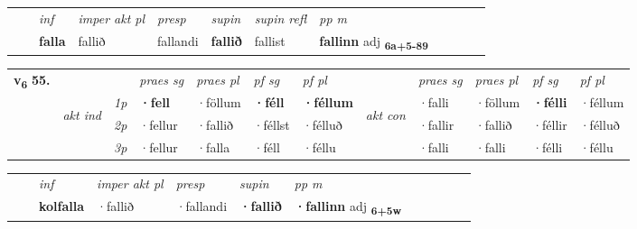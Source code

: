 \begin{tabular}{llllllllllll}
 & & \textit{inf}  & \textit{imper akt pl}   & \textit{presp} & \textit{supin} & \textit{supin refl} & \textit{pp m}     \\*
  & & \textbf{falla}   & fallið   & fallandi &  \textbf{fallið} & fallist & \textbf{fallinn} adj \textbf{\textsubscript{6a+5-89}} \\*
\cmidrule{1-12}
\end{tabular}



\begin{tabular}{llllllllllll} \toprule
\multirow{4}{*}{{{\textbf{v{\textsubscript{6}}} \Large{\textbf{55.}}}}}  & &   &  \textit{praes sg}  & \textit{praes pl}  &\textit{ pf sg} & \textit{pf pl} &  &  \textit{praes sg}  & \textit{praes pl}  & \textit{pf sg} & \textit{pf pl } \\*
	\cmidrule{4-7} \cmidrule{9-12}
 & \multirow{3}{*}{\begin{turn}{90}\textit{akt ind}\end{turn}} & {\textit{1p}} & \textbf{·fell} & ·föllum    & \textbf{·féll} & \textbf{·féllum} & \multirow{3}{*}{\begin{turn}{90}\textit{akt con}\end{turn}} &·falli & ·föllum & \textbf{·félli} & ·féllum\\*
& &  {\textit{2p}} &  ·fellur  & ·fallið   & ·féllst & ·félluð & & ·fallir & ·fallið & ·féllir & ·félluð \\*
& &  {\textit{3p}} & ·fellur & ·falla   & ·féll & ·féllu & & ·falli & ·falli& ·félli & ·féllu  \\*
\cmidrule{4-7} \cmidrule{9-12}
\end{tabular}


\begin{tabular}{llllllllllll}
 & & \textit{inf}  & \textit{imper akt pl}   & \textit{presp} & \textit{supin}  & \textit{pp m}     \\*
  & & \textbf{kolfalla}   & ·fallið   & ·fallandi &  \textbf{·fallið}  & \textbf{·fallinn} adj \textbf{\textsubscript{6+5w}} \\*
\cmidrule{1-12}
\end{tabular}




